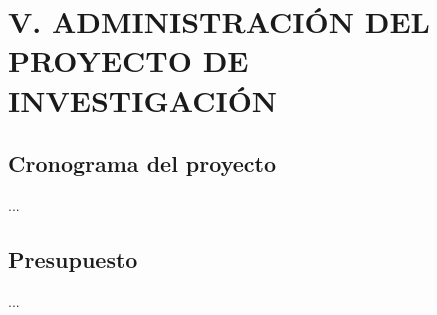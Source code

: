 \chapter{V. ADMINISTRACIÓN DEL PROYECTO DE INVESTIGACIÓN }
\section{Cronograma del proyecto}
...
\section{Presupuesto}
...
